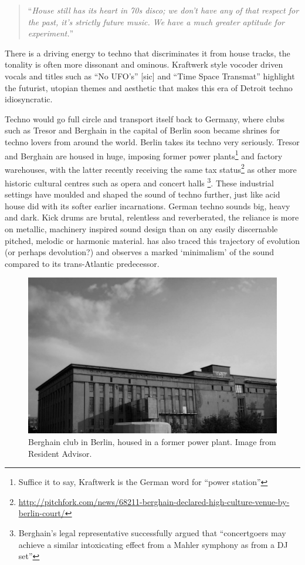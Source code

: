 \blockcquote[]{collins_schedel_wilson_2013}{``\textit{House still has its heart in 70s disco; we don’t have any of that respect for the past, it’s strictly future music. We have a much greater aptitude for experiment.}''}

There is a driving energy to techno that discriminates it from house tracks, the tonality is often more dissonant and ominous. Kraftwerk style vocoder driven vocals and titles such as “No UFO’s” [sic] and “Time Space Transmat” highlight the futurist, utopian themes and aesthetic that makes this era of Detroit techno idiosyncratic. 

Techno would go full circle and transport itself back to Germany, where clubs such as Tresor and Berghain in the capital of Berlin soon became shrines for techno lovers from around the world. Berlin takes its techno very seriously. Tresor and Berghain are housed in huge, imposing former power plants\footnote{Suffice it to say, Kraftwerk is the German word for “power station”} and factory warehouses, with the latter recently receiving the same tax status\footnote{\url{http://pitchfork.com/news/68211-berghain-declared-high-culture-venue-by-berlin-court/}} as other more historic cultural centres such as opera and concert halls \footnote{Berghain’s legal representative successfully argued that “concertgoers may achieve a similar intoxicating effect from a Mahler symphony as from a DJ set”}. These industrial settings have moulded and shaped the sound of techno further, just like acid house did with its softer earlier incarnations. German techno sounds big, heavy and dark. Kick drums are brutal, relentless and reverberated, the reliance is more on metallic, machinery inspired sound design than on any easily discernable pitched, melodic or harmonic material. \cite{Nye2013} has also traced this trajectory of evolution (or perhaps devolution?) and observes a marked `minimalism' of the sound compared to its trans-Atlantic predecessor.

\begin{figure}
	\begin{center}
		\includegraphics[width=\figSizeHundred]{ch02_dancemusic/figures/berghain.jpg}
	\end{center}
	\caption[Berghain club in Berlin]{Berghain club in Berlin, housed in a former power plant. Image from Resident Advisor.}
	\label{fig:roland}
\end{figure}


